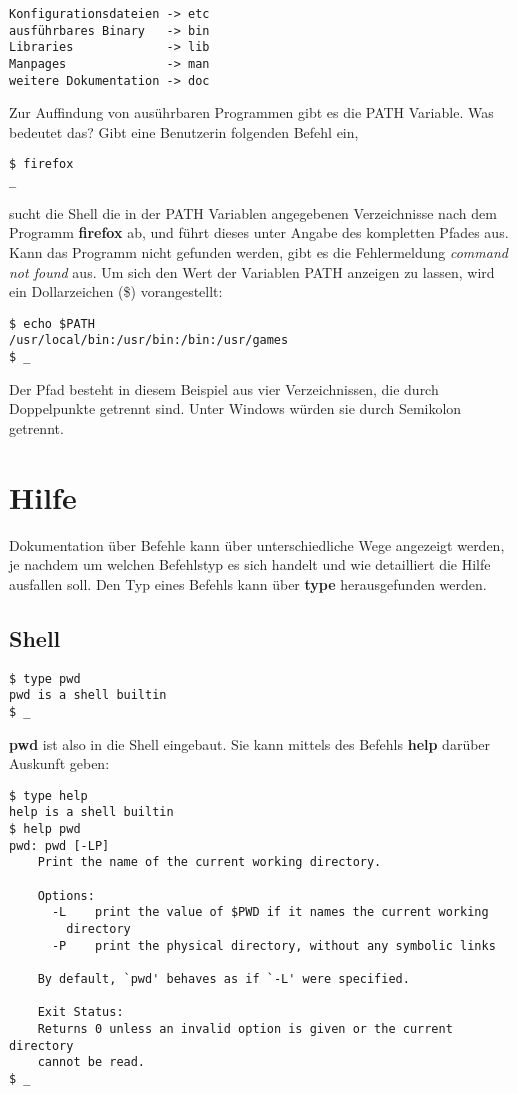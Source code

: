 \documentclass[titlepage,a4paper]{article}
\begin{document}
\begin{verbatim}
Konfigurationsdateien -> etc
ausführbares Binary   -> bin
Libraries             -> lib
Manpages              -> man
weitere Dokumentation -> doc
\end{verbatim}

Zur Auffindung von ausührbaren Programmen gibt es die PATH Variable.
Was bedeutet das?  Gibt eine Benutzerin folgenden Befehl ein,

\begin{verbatim}
$ firefox
_
\end{verbatim}

sucht die Shell die in der PATH Variablen angegebenen Verzeichnisse nach dem
Programm \textbf{firefox} ab, und führt dieses unter Angabe des kompletten
Pfades aus.  Kann das Programm nicht gefunden werden, gibt es die
Fehlermeldung \emph{command not found} aus.  Um sich den Wert der Variablen
PATH anzeigen zu lassen, wird ein Dollarzeichen (\$) vorangestellt:

\begin{verbatim}
$ echo $PATH
/usr/local/bin:/usr/bin:/bin:/usr/games
$ _
\end{verbatim}

Der Pfad besteht in diesem Beispiel aus vier Verzeichnissen, die durch
Doppelpunkte getrennt sind.  Unter Windows würden sie durch Semikolon getrennt.

\section{Hilfe}

Dokumentation über Befehle kann über unterschiedliche Wege angezeigt werden,
je nachdem um welchen Befehlstyp es sich handelt und wie detailliert 
die Hilfe ausfallen soll.  Den Typ eines Befehls kann über \textbf{type}
herausgefunden werden.

\subsection{Shell}

\begin{verbatim}
$ type pwd
pwd is a shell builtin
$ _
\end{verbatim}

\textbf{pwd} ist also in die Shell eingebaut.  Sie kann mittels
des Befehls \textbf{help} darüber Auskunft geben:

\begin{verbatim}
$ type help
help is a shell builtin
$ help pwd
pwd: pwd [-LP]
    Print the name of the current working directory.
    
    Options:
      -L	print the value of $PWD if it names the current working
    	directory
      -P	print the physical directory, without any symbolic links
    
    By default, `pwd' behaves as if `-L' were specified.
    
    Exit Status:
    Returns 0 unless an invalid option is given or the current directory
    cannot be read.
$ _
\end{verbatim}
\end{document}
